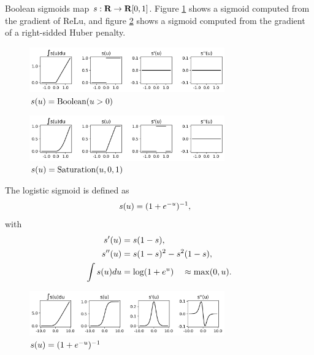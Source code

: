 \documentclass{article}
\begin{document}
    Boolean sigmoids map $s:\textbf{R}\to\textbf{R}[0,1]$.
    Figure \ref{fig:relu_sig} shows a sigmoid computed from the gradient of ReLu, and figure \ref{fig:soft_relu_sig} shows a sigmoid computed from
    the gradient of a right-sidded Huber penalty.
    \begin{figure}[h!]
        \centering
        \includegraphics[width=0.75\textwidth]{./figs/nn/sig/relu.png}
        \caption{$s(u)=\text{Boolean}(u>0)$}
        \label{fig:relu_sig}
    \end{figure}
    \begin{figure}[h!]
        \centering
        \includegraphics[width=0.75\textwidth]{./figs/nn/sig/soft_relu.png}
        \caption{$s(u)=\text{Saturation}(u,0,1)$}
        \label{fig:soft_relu_sig}
    \end{figure}

    The logistic sigmoid is defined as
    \begin{align}
        s(u) &= (1+e^{-u})^{-1},
    \end{align}
    with
    \begin{align*}
        s'(u)&=s(1-s),\\
        s''(u)&=s(1-s)^2-s^2(1-s),\\
        \int s(u) du&= \log(1+e^u)\quad\approx\max(0,u).
    \end{align*}
    \begin{figure}[h!]
        \centering
        \includegraphics[width=0.75\textwidth]{./figs/nn/sig/logistic.png}
        \caption{$s(u)=(1+e^{-u})^{-1}$}
        \label{fig:logistic}
    \end{figure}
\end{document}
